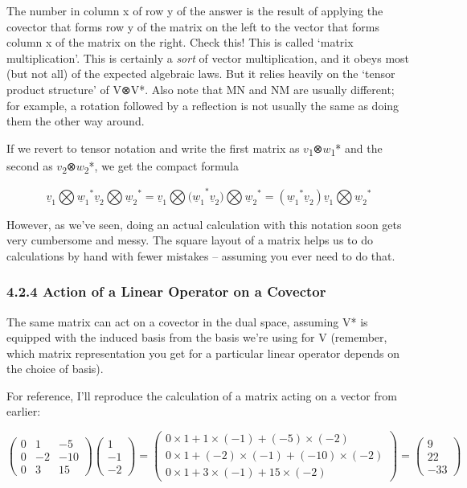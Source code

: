 \documentclass[oneside,english]{amsbook}
\numberwithin{section}{chapter}
\theoremstyle{plain}
\theoremstyle{definition}
\begin{document}
The number in column x of row y of the answer is the result of applying
the covector that forms row y of the matrix on the left to the vector
that forms column x of the matrix on the right. Check this! This is
called `matrix multiplication'. This is certainly a \emph{sort} of
vector multiplication, and it obeys most (but not all) of the expected
algebraic laws. But it relies heavily on the `tensor product
structure' of V⊗V*. Also note that MN and NM are usually different; for
example, a rotation followed by a reflection is not usually the same as
doing them the other way around.

If we revert to tensor notation and write the first matrix as
$v$\textsubscript{1}⊗$w$\textsubscript{1}* and the second as
$v$\textsubscript{2}⊗$w$\textsubscript{2}*, we get the compact
formula

\[{{\underline{v}}_{1}\bigotimes{{\underline{w}}_{1}}^{*}{\underline{v}}_{2}\bigotimes{{\underline{w}}_{2}}^{*} = {\underline{v}}_{1}\bigotimes{{(\underline{w}}_{1}}^{*}{\underline{v}}_{2})\bigotimes{{\underline{w}}_{2}}^{*}
}{= ({{\underline{w}}_{1}}^{*}{\underline{v}}_{2}){\underline{v}}_{1}\bigotimes{{\underline{w}}_{2}}^{*}}\]

However, as we've seen, doing an actual calculation with this notation
soon gets very cumbersome and messy. The square layout of a matrix helps
us to do calculations by hand with fewer mistakes -- assuming you ever
need to do that.

\subsubsection{4.2.4 Action of a Linear Operator on a
	Covector}\label{action-of-a-linear-operator-on-a-covector}

The same matrix can act on a covector in the dual space, assuming V* is
equipped with the induced basis from the basis we're using for V
(remember, which matrix representation you get for a particular linear
operator depends on the choice of basis).

For reference, I'll reproduce the calculation of a matrix acting on a
vector from earlier:

\[\begin{pmatrix}
	0 & 1 & - 5 \\
	0 & - 2 & - 10 \\
	0 & 3 & 15
\end{pmatrix}\begin{pmatrix}
	1 \\
	- 1 \\
	- 2
\end{pmatrix} = \begin{pmatrix}
	0 \times 1 + 1 \times ( - 1) + ( - 5) \times ( - 2) \\
	0 \times 1 + ( - 2) \times ( - 1) + ( - 10) \times ( - 2) \\
	0 \times 1 + 3 \times ( - 1) + 15 \times ( - 2)
\end{pmatrix} = \begin{pmatrix}
	9 \\
	22 \\
	- 33
\end{pmatrix}\]
\end{document}
